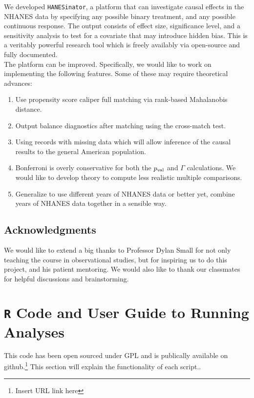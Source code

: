 \documentclass[12pt]{article}
\begin{document}
We developed \texttt{HANESinator}, a platform that can investigate causal effects in the NHANES data by specifying any possible binary treatment, and any possible continuous response. The output consists of effect size, significance level, and a sensitivity analysis to test for a covariate that may introduce hidden bias. This is a veritably powerful research tool which is freely availably via open-source and fully documented. \\

The platform can be improved. Specifically, we would like to work on implementing the following features. Some of these may require theoretical advances:

\begin{enumerate}
\item Use propensity score caliper full matching via rank-based Mahalanobis distance.
\item Output balance diagnostics after matching using the cross-match test.
\item Using records with missing data which will allow inference of the causal results to the general American population.
\item Bonferroni is overly conservative for both the $p_{\text{val}}$ and $\Gamma$ calculations. We would like to develop theory to compute less realistic multiple comparisons.
\item Generalize to use different years of NHANES data or better yet, combine years of NHANES data together in a sensible way.
\end{enumerate}

\subsection*{Acknowledgments}

We would like to extend a big thanks to Professor Dylan Small for not only teaching the course in observational studies, but for inspiring us to do this project, and his patient mentoring. We would also like to thank our classmates for helpful discussions and brainstorming.


\appendix
\section{\texttt{R} Code and User Guide to Running Analyses}\label{app:code_and_guide}

This code has been open sourced under GPL and is publically available on github.\footnote{Insert URL link here} This section will explain the functionality of each script..
\end{document}
